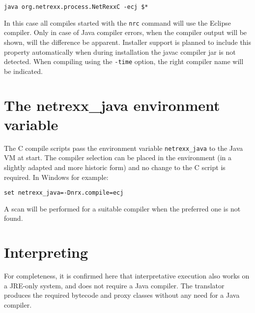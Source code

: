 \begin{verbatim}
java org.netrexx.process.NetRexxC -ecj $*
\end{verbatim}
 
In this case all compiles started with the \texttt{nrc} command will use the Eclipse compiler. Only in case of Java compiler errors, when the compiler output will be shown, will the difference be apparent. Installer support is planned to include this property automatically when during \nr{} installation the javac compiler jar is not detected. When compiling using the \texttt{-time} option, the right compiler name will be indicated.
\section{The netrexx\_java environment variable}
The \nr{}C compile scripts pass the environment variable \texttt{netrexx\_java} to the Java VM at start. The compiler selection can be placed in the environment (in a slightly adapted and more historic form) and no change to the \nr{}C script is required. In Windows for example:
\begin{verbatim}
set netrexx_java=-Dnrx.compile=ecj
\end{verbatim}
A scan will be performed for a suitable compiler when the preferred one is not found. 

\section{Interpreting}
For completeness, it is confirmed here that interpretative execution also works on a JRE-only system, and does not require a Java compiler. The \nr{} translator produces the required bytecode and proxy classes without any need for a Java compiler.
 